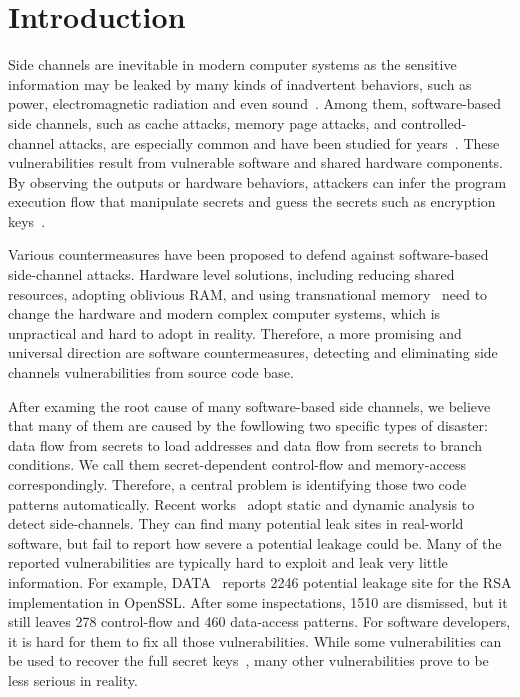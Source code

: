 \section{Introduction}
Side channels are inevitable in modern computer systems as the sensitive information 
may be leaked by many kinds of inadvertent behaviors, 
such as power, electromagnetic radiation and even sound~\cite{xxx}. 
Among them, software-based side channels, such as cache attacks, memory page attacks,
and controlled-channel attacks, are especially common 
and have been studied for years~\cite{xxx}. 
These vulnerabilities result from vulnerable software and shared hardware components.
By observing the outputs or hardware behaviors, attackers can
infer the program execution flow that manipulate secrets and 
guess the secrets such as encryption keys~\cite{}.

Various countermeasures have been proposed to defend against 
software-based side-channel attacks. Hardware level solutions, 
including reducing shared resources, adopting oblivious RAM, and using
transnational memory~\cite{182946,203878,217537} need to change the hardware
and modern complex computer systems, which is unpractical and hard to adopt in 
reality. Therefore, a more promising and universal direction are software countermeasures, 
detecting and eliminating side channels vulnerabilities from source code base.

After examing the root cause of many software-based side channels, we believe that
many of them are caused by the fowllowing two specific types of disaster: 
data flow from secrets to load addresses and data flow from secrets to branch conditions.
We call them secret-dependent control-flow and memory-access correspondingly.
Therefore, a central problem is identifying those two code patterns automatically.
Recent works~\cite{203878} adopt static and dynamic analysis
to detect side-channels.
They can find many potential leak sites in real-world software, 
but fail to report how severe a potential leakage could be. 
Many of the reported vulnerabilities are typically hard to exploit
and leak very little information. For example, DATA~\cite{} reports
2246 potential leakage site for the RSA implementation in OpenSSL.
After some inspectations, 1510 are dismissed, but it still
leaves 278 control-flow and 460 data-access patterns. For software
developers, it is hard for them to fix all those vulnerabilities.
While some vulnerabilities can be used to recover the full secret
keys~\cite{}, many other vulnerabilities prove to be less serious in reality.

